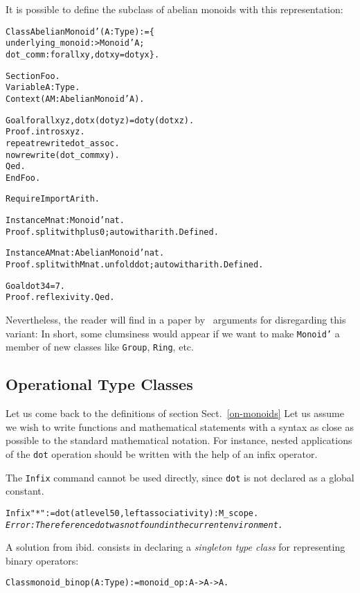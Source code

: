 \documentclass[a4]{report}
\begin{document}
It is possible to define the subclass of abelian monoids with this representation:
\begin{alltt}
Class AbelianMonoid' (A:Type) := \{
 underlying_monoid :> Monoid' A;
 dot_comm : forall x y, dot x y = dot y x \}.

Section Foo.
  Variable A : Type.
  Context (AM : AbelianMonoid' A).

  Goal forall x y z, dot x (dot y z) = dot y (dot x z).
  Proof. intros x y z.
    repeat rewrite dot_assoc.
    now rewrite (dot_comm x y).
  Qed.
End Foo.

Require Import Arith.

Instance Mnat : Monoid' nat.
Proof. split with plus 0;auto with arith. Defined.

Instance AMnat : AbelianMonoid' nat.
Proof. split with Mnat. unfold dot;auto with arith. Defined.

Goal dot 3 4 = 7.
Proof. reflexivity. Qed.
\end{alltt}

Nevertheless,  the reader will find in a paper by~\citet{math-classes}
arguments for disregarding this variant:
In short, some clumsiness would appear if we want to make \texttt{Monoid'}
a member of new classes like \texttt{Group}, \texttt{Ring}, etc.



\subsection{Operational Type Classes}
Let us come back to the definitions of section Sect.~\ref{on-monoids}
Let us assume we wish to write functions and mathematical statements
with a syntax as close as possible to the standard mathematical notation. 
For instance, nested applications of the \texttt{dot} operation should
be written with the help of an infix operator.

The \texttt{Infix} command cannot be used directly, since \texttt{dot}
is not declared as a global constant. 

\begin{alltt}
Infix "*" := dot (at level 50, left associativity):M_scope. \it 
Error: The reference dot was not found in the current environment.
\end{alltt}
 A solution from ibid. consists in declaring a \emph{singleton type class} for representing binary operators:

\begin{alltt}
Class monoid_binop (A:Type) := monoid_op : A -> A -> A.   
\end{alltt}
\end{document}
